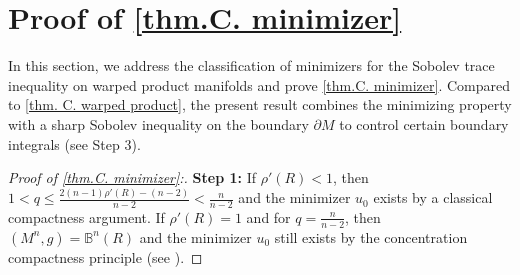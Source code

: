 \documentclass[12pt]{amsart}%
\numberwithin{equation}{section}
\numberwithin{lemma}{section}
\numberwithin{proposition}{section}
\numberwithin{corollary}{section}
\numberwithin{remark}{section}
\begin{document}
\section{Proof of \cref{thm.C. minimizer}}\label{Sec.4}
In this section, we address the classification of minimizers for the Sobolev trace inequality on warped product manifolds and prove \cref{thm.C. minimizer}. Compared to \cref{thm. C. warped product}, the present result combines the minimizing property with a sharp Sobolev inequality on the boundary $\partial M$ to control certain boundary integrals (see Step 3).
\begin{proof}[Proof of \cref{thm.C. minimizer}:]
    \textbf{Step 1:}
        If $\rho'(R)<1$, then $1<q\leq \frac{2(n-1)\rho'(R)-(n-2)}{n-2}<\frac{n}{n-2}$ and the minimizer $u_0$ exists by a classical compactness argument. If $\rho'(R)=1$ and for $q=\frac{n}{n-2}$, then $(M^n,g)=\mathbb{B}^n(R)$ and the minimizer $u_0$ still exists by the concentration compactness principle \cite{Lio85} (see \cite[Page 693]{Esc88}).
        

\end{proof}
\end{document}
